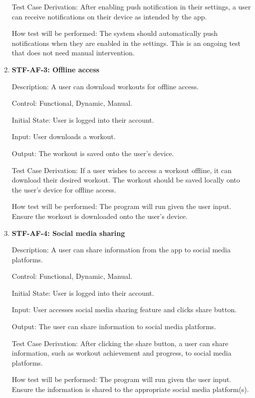 \documentclass[12pt, titlepage]{article}
\begin{document}
\begin{enumerate}
        Test Case Derivation: After enabling push notification in their settings, a user can receive notifications on their device as intended by the app.

        How test will be performed: The system should automatically push notifications when they are enabled in the settings. This is an ongoing test that does not need manual intervention.

        \item{\textbf{STF-AF-3: Offline access}\\}

        Description: A user can download workouts for offline access.

        Control: Functional, Dynamic, Manual.

        Initial State: User is logged into their account.

        Input: User downloads a workout.

        Output: The workout is saved onto the user’s device.

        Test Case Derivation: If a user wishes to access a workout offline, it can download their desired workout. The workout should be saved locally onto the user’s device for offline access.

        How test will be performed: The program will run given the user input. Ensure the workout is downloaded onto the user’s device.

        \item{\textbf{STF-AF-4: Social media sharing}\\}

        Description: A user can share information from the app to social media platforms.

        Control: Functional, Dynamic, Manual.

        Initial State: User is logged into their account.

        Input: User accesses social media sharing feature and clicks share button.

        Output: The user can share information to social media platforms.

        Test Case Derivation: After clicking the share button, a user can share information, such as workout achievement and progress, to social media platforms.

        How test will be performed: The program will run given the user input. Ensure the information is shared to the appropriate social media platform(s).


    \end{enumerate}
\end{document}
